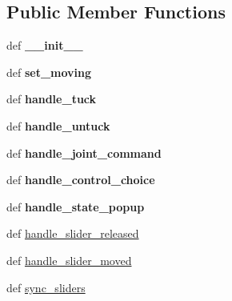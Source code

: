 \subsection*{Public Member Functions}
\begin{DoxyCompactItemize}
\item 
\hypertarget{classaml__demos_1_1joint__sliders_1_1_slider_window_afa1ca4cddbd12a9027a99333ea87b56f}{def {\bfseries \-\_\-\-\_\-init\-\_\-\-\_\-}}\label{classaml__demos_1_1joint__sliders_1_1_slider_window_afa1ca4cddbd12a9027a99333ea87b56f}

\item 
\hypertarget{classaml__demos_1_1joint__sliders_1_1_slider_window_a5dd6c7c071927cc93d1a84905dcb2e30}{def {\bfseries set\-\_\-moving}}\label{classaml__demos_1_1joint__sliders_1_1_slider_window_a5dd6c7c071927cc93d1a84905dcb2e30}

\item 
\hypertarget{classaml__demos_1_1joint__sliders_1_1_slider_window_a6b31a26195f58d3d6571d63e641ff0e1}{def {\bfseries handle\-\_\-tuck}}\label{classaml__demos_1_1joint__sliders_1_1_slider_window_a6b31a26195f58d3d6571d63e641ff0e1}

\item 
\hypertarget{classaml__demos_1_1joint__sliders_1_1_slider_window_a00664dc7ce5e56153fa5c794b37d7f08}{def {\bfseries handle\-\_\-untuck}}\label{classaml__demos_1_1joint__sliders_1_1_slider_window_a00664dc7ce5e56153fa5c794b37d7f08}

\item 
\hypertarget{classaml__demos_1_1joint__sliders_1_1_slider_window_a477454328072f30d0c1d19aecb2a41c5}{def {\bfseries handle\-\_\-joint\-\_\-command}}\label{classaml__demos_1_1joint__sliders_1_1_slider_window_a477454328072f30d0c1d19aecb2a41c5}

\item 
\hypertarget{classaml__demos_1_1joint__sliders_1_1_slider_window_a42573c21b043561d97ca38e3397cab24}{def {\bfseries handle\-\_\-control\-\_\-choice}}\label{classaml__demos_1_1joint__sliders_1_1_slider_window_a42573c21b043561d97ca38e3397cab24}

\item 
\hypertarget{classaml__demos_1_1joint__sliders_1_1_slider_window_a7064a4f52e00ba05d5b1db667ff67ba7}{def {\bfseries handle\-\_\-state\-\_\-popup}}\label{classaml__demos_1_1joint__sliders_1_1_slider_window_a7064a4f52e00ba05d5b1db667ff67ba7}

\item 
def \hyperlink{classaml__demos_1_1joint__sliders_1_1_slider_window_a1a300019001fffb3570c2876971e30dc}{handle\-\_\-slider\-\_\-released}
\item 
def \hyperlink{classaml__demos_1_1joint__sliders_1_1_slider_window_ada37e123e4350bccc8bec77b1bda529e}{handle\-\_\-slider\-\_\-moved}
\item 
def \hyperlink{classaml__demos_1_1joint__sliders_1_1_slider_window_a8c41833836b79aae64dadd19a15060d0}{sync\-\_\-sliders}
\end{DoxyCompactItemize}
